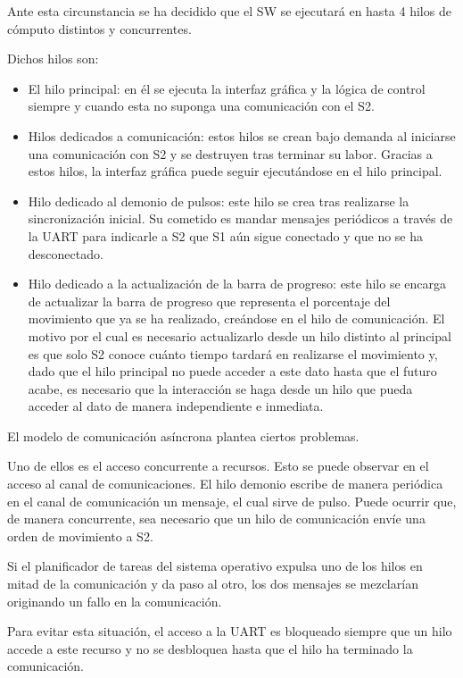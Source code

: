 Ante esta circunstancia se ha decidido que el \ac{SW} se ejecutará en hasta 4 hilos de cómputo distintos y concurrentes.

Dichos hilos son:

\begin{itemize}
    \item El hilo principal: en él se ejecuta la interfaz gráfica y la lógica de control siempre y cuando esta no suponga una comunicación con el \ac{S2}.
    \item Hilos dedicados a comunicación: estos hilos se crean bajo demanda al iniciarse una comunicación con \ac{S2} y se destruyen tras terminar su labor. Gracias a estos hilos, la interfaz gráfica puede seguir ejecutándose en el hilo principal.
    \item Hilo dedicado al demonio de pulsos: este hilo se crea tras realizarse la sincronización inicial. Su cometido es mandar mensajes periódicos a través de la UART para indicarle a \ac{S2} que \ac{S1} aún sigue conectado y que no se ha desconectado.
    \item Hilo dedicado a la actualización de la barra de progreso: este hilo se encarga de actualizar la barra de progreso que representa el porcentaje del movimiento que ya se ha realizado, creándose en el hilo de comunicación. El motivo por el cual es necesario actualizarlo desde un hilo distinto al principal es que solo \ac{S2} conoce cuánto tiempo tardará en realizarse el movimiento y, dado que el hilo principal no puede acceder a este dato hasta que el futuro acabe, es necesario que la interacción se haga desde un hilo que pueda acceder al dato de manera independiente e inmediata.
\end{itemize}

El modelo de comunicación asíncrona plantea ciertos problemas.

Uno de ellos es el acceso concurrente a recursos. Esto se puede observar en el acceso al canal de comunicaciones. El hilo demonio escribe de manera periódica en el canal de comunicación un mensaje, el cual sirve de pulso. Puede ocurrir que, de manera concurrente, sea necesario que un hilo de comunicación envíe una orden de movimiento a \ac{S2}.

Si el planificador de tareas del sistema operativo expulsa uno de los hilos en mitad de la comunicación y da paso al otro, los dos mensajes se mezclarían originando un fallo en la comunicación. 

Para evitar esta situación, el acceso a la UART es bloqueado siempre que un hilo accede a este recurso y no se desbloquea hasta que el hilo ha terminado la comunicación.

